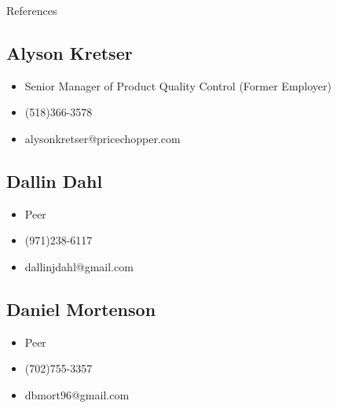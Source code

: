 \documentclass{resume} %
\begin{document}
\begin{rSection}{References}
\subsection*{Alyson Kretser}    
\begin{itemize}
    \item[] Senior Manager of Product Quality Control (Former Employer)
    \item[] (518)366-3578
    \item[] alysonkretser@pricechopper.com
\end{itemize}

\subsection*{Dallin Dahl}    
\begin{itemize}
    \item[] Peer
    \item[] (971)238-6117
    \item[] dallinjdahl@gmail.com
\end{itemize}

\subsection*{Daniel Mortenson}    
\begin{itemize}
    \item[] Peer
    \item[] (702)755-3357
    \item[] dbmort96@gmail.com
\end{itemize}

\end{rSection}
\end{document}
